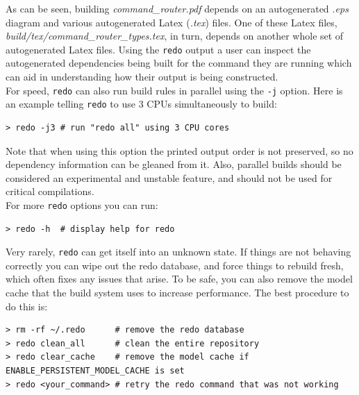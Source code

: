 As can be seen, building \textit{command\_router.pdf} depends on an autogenerated \textit{.eps} diagram and various autogenerated Latex (\textit{.tex}) files. One of these Latex files, \textit{build/tex/command\_router\_types.tex}, in turn, depends on another whole set of autogenerated Latex files. Using the \texttt{redo} output a user can inspect the autogenerated dependencies being built for the command they are running which can aid in understanding how their output is being constructed. \\

For speed, \texttt{redo} can also run build rules in parallel using the \texttt{-j} option. Here is an example telling \texttt{redo} to use 3 CPUs simultaneously to build:

\vspace{5mm} %
\begin{verbatim}
> redo -j3 # run "redo all" using 3 CPU cores
\end{verbatim}
\vspace{5mm} %

Note that when using this option the printed output order is not preserved, so no dependency information can be gleaned from it. Also, parallel builds should be considered an experimental and unstable feature, and should not be used for critical compilations. \\

For more \texttt{redo} options you can run:

\vspace{5mm} %
\begin{verbatim}
> redo -h  # display help for redo
\end{verbatim}
\vspace{5mm} %

Very rarely, \texttt{redo} can get itself into an unknown state. If things are not behaving correctly you can wipe out the redo database, and force things to rebuild fresh, which often fixes any issues that arise. To be safe, you can also remove the model cache that the build system uses to increase performance. The best procedure to do this is:

\vspace{5mm} %
\begin{verbatim}
> rm -rf ~/.redo      # remove the redo database
> redo clean_all      # clean the entire repository
> redo clear_cache    # remove the model cache if ENABLE_PERSISTENT_MODEL_CACHE is set
> redo <your_command> # retry the redo command that was not working
\end{verbatim}
\vspace{5mm} %

